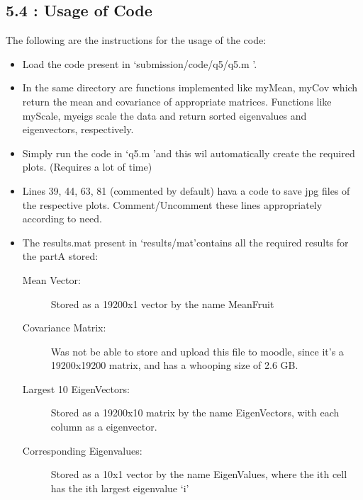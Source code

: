 \documentclass[12pt, a4paper]{article}
\begin{document}
\subsection*{5.4 : Usage of Code}
The following are the instructions for the usage of the code:
\begin{itemize}
\item Load the code present in \lq submission/code/q5/q5.m \rq \space.
\item In the same directory are functions implemented like myMean, myCov which return the mean and covariance of appropriate matrices. Functions like myScale, myeigs scale the data and return sorted eigenvalues and eigenvectors, respectively.
\item Simply run the code in \lq q5.m \rq \space and this wil automatically create the required plots. (Requires a lot of time)
\item Lines 39, 44, 63, 81 (commented by default) hava a code to save jpg files of the respective plots. Comment/Uncomment these lines appropriately according to need.
\item The results.mat present in \lq results/mat\rq \space contains all the required results for the partA stored: 
	\begin{description}
	\item[Mean Vector:] Stored as a 19200x1 vector by the name MeanFruit
	\item[Covariance Matrix:] Was not be able to store and upload this file to moodle, since it's a 19200x19200 matrix, and has a whooping size of 2.6 GB.
	\item[Largest 10 EigenVectors:] Stored as a 19200x10 matrix by the name EigenVectors, with each column as a eigenvector.
	\item[Corresponding Eigenvalues:] Stored as a 10x1 vector by the name EigenValues, where the ith cell has the ith largest eigenvalue \lq i\rq
	\end{description}

\end{itemize}
 
\end{document}
